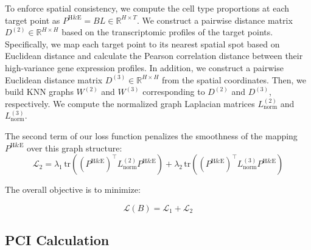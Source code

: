 \documentclass[10pt,a4paper]{article}
\begin{document}
To enforce spatial consistency, we compute the cell type proportions at each target point as $P^{\mathrm{H\&E}} = B L \in \mathbb{R}^{H \times T}$. We construct a pairwise distance matrix $D^{(2)} \in \mathbb{R}^{H \times H}$ based on the transcriptomic profiles of the target points. Specifically, we map each target point to its nearest spatial spot based on Euclidean distance and calculate the Pearson correlation distance between their high-variance gene expression profiles. In addition, we construct a pairwise Euclidean distance matrix $D^{(3)} \in \mathbb{R}^{H \times H}$ from the spatial coordinates. Then, we build KNN graphs $W^{(2)}$ and $W^{(3)}$ corresponding to $D^{(2)}$ and $D^{(3)}$, respectively. We compute the normalized graph Laplacian matrices $L_{\mathrm{norm}}^{(2)}$ and $L_{\mathrm{norm}}^{(3)}$.

The second term of our loss function penalizes the smoothness of the mapping $P^{\mathrm{H\&E}}$ over this graph structure:
\begin{equation}
\mathcal{L}_{2} = \lambda_{1} \, \mathrm{tr}\left( (P^{\mathrm{H\&E}})^{\top} L_{\mathrm{norm}}^{(2)} P^{\mathrm{H\&E}} \right) + \lambda_{2} \, \mathrm{tr}\left( (P^{\mathrm{H\&E}})^{\top} L_{\mathrm{norm}}^{(3)} P^{\mathrm{H\&E}} \right)
\end{equation}

The overall objective is to minimize:

\begin{equation}
\mathcal{L}(B) = \mathcal{L}_{1} + \mathcal{L}_{2}
\end{equation}

\subsection{PCI Calculation}
\end{document}
